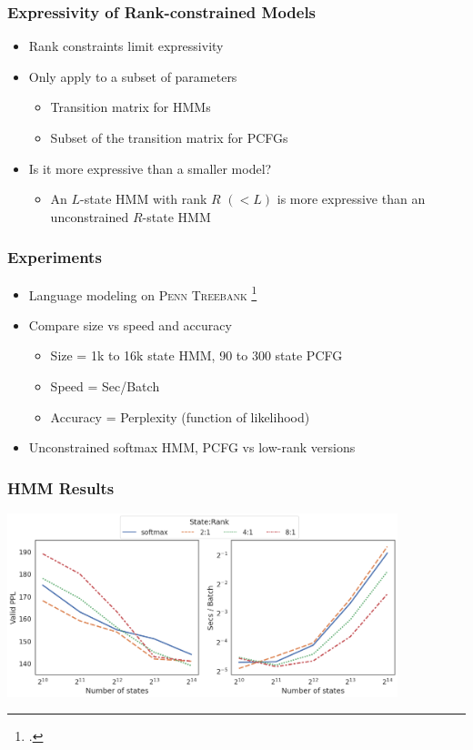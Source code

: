 \documentclass{beamer}
\begin{document}
\begin{frame}
\frametitle{Expressivity of Rank-constrained Models}
\begin{itemize}
\item Rank constraints limit expressivity
\vspace{1em}
\item Only apply to a subset of parameters
    \begin{itemize}
    \item Transition matrix for HMMs
    \item Subset of the transition matrix for PCFGs
    \end{itemize}
\vspace{1em}
\item Is it more expressive than a smaller model?
    \begin{itemize}
    \item An $L$-state HMM with rank $R$ $(< L)$ is more
        expressive than an unconstrained $R$-state HMM
    \end{itemize}
\end{itemize}
\end{frame}

\begin{frame}
\frametitle{Experiments}
\begin{itemize}
\item Language modeling on \textsc{Penn Treebank} \footcite{ptb}
\vspace{1em}
\item Compare size vs speed and accuracy
    \begin{itemize}
    \item Size = 1k to 16k state HMM, 90 to 300 state PCFG
    \item Speed = Sec/Batch
    \item Accuracy = Perplexity (function of likelihood)
    \end{itemize}
\vspace{1em}
\item Unconstrained softmax HMM, PCFG vs low-rank versions %
\end{itemize}
\end{frame}

\begin{frame}
\frametitle{HMM Results}
\centering
\includegraphics[height=2.1in]{imgs/hmm/lhmm-speed-acc-joint.png}
\end{frame}
\end{document}
